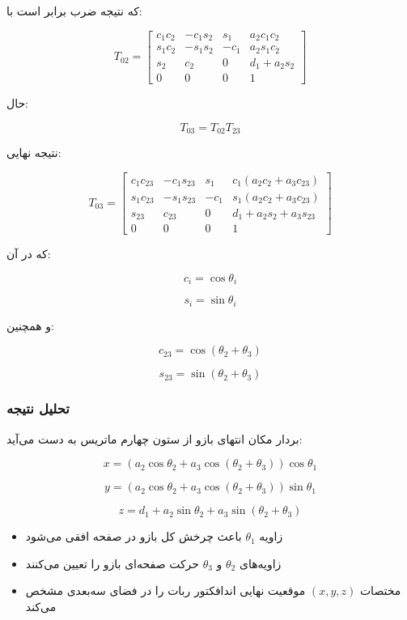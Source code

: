 \documentclass{article}
\begin{document}
که نتیجه ضرب برابر است با:

\[
T_{02} =
\left[
\begin{array}{ccc|c}
	c_1 c_2 & -c_1 s_2 & s_1 & a_2 c_1 c_2 \\
	s_1 c_2 & -s_1 s_2 & -c_1 & a_2 s_1 c_2 \\
	s_2 & c_2 & 0 & d_1 + a_2 s_2 \\
	\hline
	0 & 0 & 0 & 1
\end{array}
\right]
\]

حال:

\[
T_{03}=T_{02}T_{23}
\]

نتیجه نهایی:

\[
T_{03} =
\left[
\begin{array}{ccc|c}
	c_1 c_{23} & -c_1 s_{23} & s_1 &
	c_1 (a_2 c_2 + a_3 c_{23}) \\
	
	s_1 c_{23} & -s_1 s_{23} & -c_1 &
	s_1 (a_2 c_2 + a_3 c_{23}) \\
	
	s_{23} & c_{23} & 0 &
	d_1 + a_2 s_2 + a_3 s_{23} \\
	
	\hline
	0 & 0 & 0 & 1
\end{array}
\right]
\]

که در آن:

\[
c_i = \cos\theta_i
\]

\[
s_i = \sin\theta_i
\]

و همچنین:

\[
c_{23} = \cos(\theta_2+\theta_3)
\]

\[
s_{23} = \sin(\theta_2+\theta_3)
\]

\subsubsection*{تحلیل نتیجه}

بردار مکان انتهای بازو از ستون چهارم ماتریس به دست می‌آید:

\[
x = (a_2\cos\theta_2 + a_3\cos(\theta_2+\theta_3))\cos\theta_1
\]

\[
y = (a_2\cos\theta_2 + a_3\cos(\theta_2+\theta_3))\sin\theta_1
\]

\[
z = d_1 + a_2\sin\theta_2 + a_3\sin(\theta_2+\theta_3)
\]



\begin{itemize}
	\item زاویه $\theta_1$ باعث چرخش کل بازو در صفحه افقی می‌شود
	\item زاویه‌های $\theta_2$ و $\theta_3$ حرکت صفحه‌ای بازو را تعیین می‌کنند
	\item مختصات $(x,y,z)$ موقعیت نهایی اندافکتور ربات را در فضای سه‌بعدی مشخص می‌کند
\end{itemize}
\end{document}
